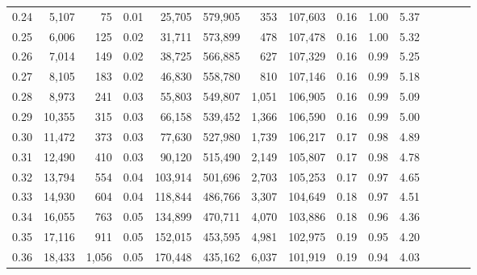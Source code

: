 \begin{tabular}{rrrcrrrrrrrrrrr}
0.24 &   5,107 &     75 &                                       0.01 &   25,705 &  579,905 &      353 &  107,603 &  0.16 &  1.00 &                         5.37 \\
0.25 &   6,006 &    125 &                                       0.02 &   31,711 &  573,899 &      478 &  107,478 &  0.16 &  1.00 &                         5.32 \\
0.26 &   7,014 &    149 &                                       0.02 &   38,725 &  566,885 &      627 &  107,329 &  0.16 &  0.99 &                         5.25 \\
0.27 &   8,105 &    183 &                                       0.02 &   46,830 &  558,780 &      810 &  107,146 &  0.16 &  0.99 &                         5.18 \\
0.28 &   8,973 &    241 &                                       0.03 &   55,803 &  549,807 &    1,051 &  106,905 &  0.16 &  0.99 &                         5.09 \\
0.29 &  10,355 &    315 &                                       0.03 &   66,158 &  539,452 &    1,366 &  106,590 &  0.16 &  0.99 &                         5.00 \\
0.30 &  11,472 &    373 &                                       0.03 &   77,630 &  527,980 &    1,739 &  106,217 &  0.17 &  0.98 &                         4.89 \\
0.31 &  12,490 &    410 &                                       0.03 &   90,120 &  515,490 &    2,149 &  105,807 &  0.17 &  0.98 &                         4.78 \\
0.32 &  13,794 &    554 &                                       0.04 &  103,914 &  501,696 &    2,703 &  105,253 &  0.17 &  0.97 &                         4.65 \\
0.33 &  14,930 &    604 &                                       0.04 &  118,844 &  486,766 &    3,307 &  104,649 &  0.18 &  0.97 &                         4.51 \\
0.34 &  16,055 &    763 &                                       0.05 &  134,899 &  470,711 &    4,070 &  103,886 &  0.18 &  0.96 &                         4.36 \\
0.35 &  17,116 &    911 &                                       0.05 &  152,015 &  453,595 &    4,981 &  102,975 &  0.19 &  0.95 &                         4.20 \\
0.36 &  18,433 &  1,056 &                                       0.05 &  170,448 &  435,162 &    6,037 &  101,919 &  0.19 &  0.94 &                         4.03 \\

\end{tabular}
